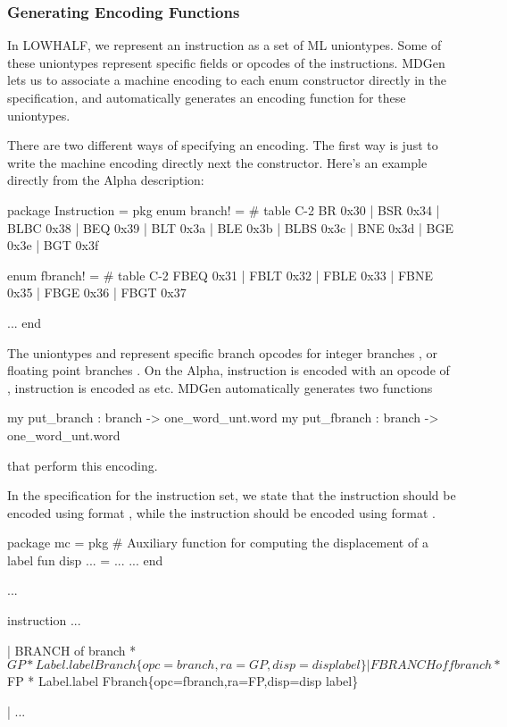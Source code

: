 \subsubsection{Generating Encoding Functions}

   In LOWHALF, we represent an instruction as a set of ML uniontypes.
Some of these uniontypes represent specific fields or 
opcodes of the instructions.
MDGen lets us to associate a machine encoding to each enum constructor
directly in the specification, and automatically generates an 
encoding function for these uniontypes.

There are two different ways of specifying an encoding.  The first way
is just to write the machine encoding directly next the constructor.
Here's an example directly from the Alpha description:
\begin{SML}
   package Instruction =
   pkg
      enum branch! =  #  table C-2 
         BR   0x30
                   | BSR 0x34
                              | BLBC 0x38
       | BEQ  0x39 | BLT 0x3a | BLE  0x3b
       | BLBS 0x3c | BNE 0x3d | BGE  0x3e
       | BGT  0x3f

      enum fbranch! = #  table C-2 
                     FBEQ 0x31 | FBLT 0x32
       | FBLE 0x33             | FBNE 0x35
       | FBGE 0x36 | FBGT 0x37

      ...
   end
\end{SML}

The uniontypes  and  represent specific
branch opcodes for integer branches , or floating point
branches .  On the Alpha, instruction  is encoded
with an opcode of , instruction  is encoded 
as  etc.  MDGen automatically generates two functions
\begin{SML}
    my put_branch : branch -> one_word_unt.word
    my put_fbranch : branch -> one_word_unt.word
\end{SML}
that perform this encoding.    

In the specification for the instruction set, we state that the
 instruction should be encoded using format ,
while the  instruction should be encoded using
format .
\begin{SML}
   package mc =
   pkg
      #  Auxiliary function for computing the displacement of a label 
      fun disp ... = ...
      ...
   end

   ...

   instruction
     ...

   | BRANCH of branch * $GP * Label.label
     Branch\{opc=branch,ra=GP,disp=disp label\}

   | FBRANCH of fbranch * $FP * Label.label
     Fbranch\{opc=fbranch,ra=FP,disp=disp label\}

   | ...
\end{SML}

